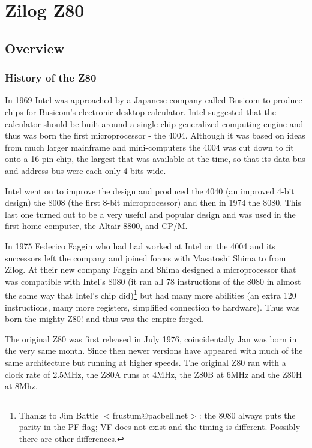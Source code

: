 \documentclass[twoside,openright,a4paper]{book}
\begin{document}
\chapter{Zilog Z80}

\minitoc

\section{Overview}
\subsection{History of the Z80}

In 1969 Intel was approached by a Japanese company called Busicom to produce  chips for Busicom's electronic desktop calculator. Intel suggested that the calculator should be built around a single-chip generalized computing engine and thus was born the first microprocessor - the 4004. Although it was based on ideas from much larger mainframe and mini-computers the 4004 was cut down to fit onto a 16-pin chip, the largest that was available at the time, so that its data bus and address bus were each only 4-bits wide. 

Intel went on to improve the design and produced the 4040 (an improved 4-bit design) the 8008 (the first 8-bit microprocessor) and then in 1974 the 8080. This last one turned out to be a very useful and popular design and was used in the first home computer, the Altair 8800, and CP/M. 

In 1975 Federico Faggin who had had worked at Intel on the 4004 and its successors left the company and joined forces with Masatoshi Shima to from Zilog. At their new company Faggin and Shima designed a microprocessor that was compatible with Intel's 8080 (it ran all 78 instructions of the 8080 in almost the same way that Intel's chip did)\footnote{Thanks to Jim Battle $<$frustum@pacbell.net$>$: the 8080 always puts the parity in the PF flag; VF does not exist and the timing is different. Possibly there are other differences.} but had many more abilities (an extra 120 instructions, many more registers, simplified connection to hardware). Thus was born the mighty Z80! and thus was the empire forged.

The original Z80 was first released in July 1976, coincidentally Jan was born in the very same month. Since then newer versions have appeared with much of the same architecture but running at higher speeds. The original Z80 ran with a clock rate of 2.5MHz, the Z80A runs at 4MHz, the Z80B at 6MHz and the Z80H at 8Mhz. 
\end{document}
